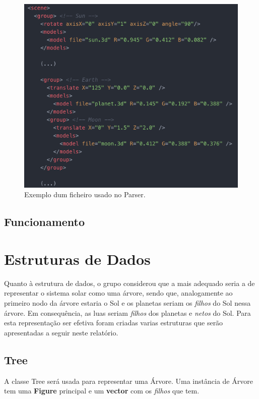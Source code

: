 \documentclass[a4paper]{article}
\begin{document}
\begin{figure}[H]
\centering
\includegraphics[scale=0.6]{ficheiro_parser.png}
\caption{Exemplo dum ficheiro usado no Parser.}
\label{img:ficheiro_parser}
\end{figure}

\subsection{Funcionamento}
\label{sec:funcionamento}


\newpage

\section{Estruturas de Dados}
\label{sec:estruturas}
Quanto à estrutura de dados, o grupo considerou que a mais adequado seria a de representar o sistema solar como uma árvore, sendo que, analogamente ao primeiro nodo da árvore estaria o Sol e os planetas seriam os \textit{filhos} do Sol nessa árvore. Em consequência, as luas seriam \textit{filhos} dos planetas e \textit{netos} do Sol.  Para esta representação ser efetiva foram criadas varias estruturas que serão apresentadas a seguir neste relatório.


\subsection{Tree}
\label{sec:tree}

A classe Tree será usada para representar uma Árvore. Uma instância de Árvore tem uma \textbf{Figure} principal e um \textbf{vector} com os \textit{filhos} que tem.
\end{document}
